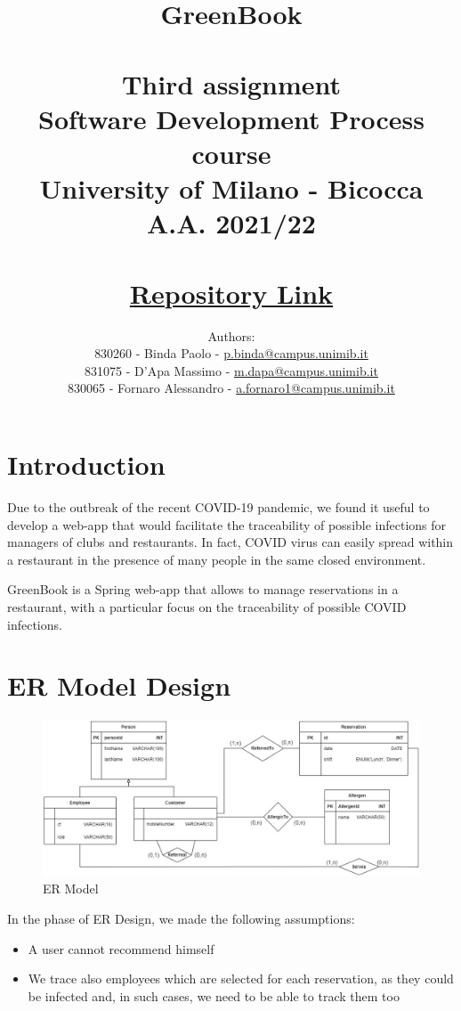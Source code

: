 \documentclass{article}
\title{\textbf{GreenBook}\\~\\
    Third assignment\\
    \small Software Development Process course\\
        University of Milano - Bicocca\\
        A.A. 2021/22\\~\\
        \href{https://gitlab.com/massimino96/2021_assignment3_greenbook/}{Repository Link}}
\author{Authors:\\
    830260 - Binda Paolo - \href{mailto:p.binda@campus.unimib.it}{p.binda@campus.unimib.it}\\
    831075 - D'Apa Massimo - \href{mailto:m.dapa@campus.unimib.it}{m.dapa@campus.unimib.it}\\
    830065 - Fornaro Alessandro - \href{mailto:a.fornaro1@campus.unimib.it}{a.fornaro1@campus.unimib.it}}
\date{}
\begin{document}
\setlength{\parindent}{0em}
\setlength{\parskip}{1em}

\maketitle
\thispagestyle{empty}

\cleardoublepage
\setcounter{page}{1}

\section*{Introduction}

Due to the outbreak of the recent COVID-19 pandemic, we found it useful to develop a web-app that would facilitate the traceability of possible infections for managers of clubs and restaurants. In fact, COVID virus can easily spread within a restaurant in the presence of many people in the same closed environment.

GreenBook is a Spring web-app that allows to manage reservations in a restaurant, with a particular focus on the traceability of possible COVID infections.

\section*{ER Model Design}
\begin{figure}[H]
    \centering
    \includegraphics[width=\textwidth]{ER}
    \caption{ER Model}
    \label{fig:ermodel}
\end{figure}

In the phase of ER Design, we made the following assumptions:
\begin{itemize}
  \item A user cannot recommend himself
  \item We trace also employees which are selected for each reservation, as they could be infected and, in such cases, we need to be able to track them too
\end{itemize}
\end{document}
